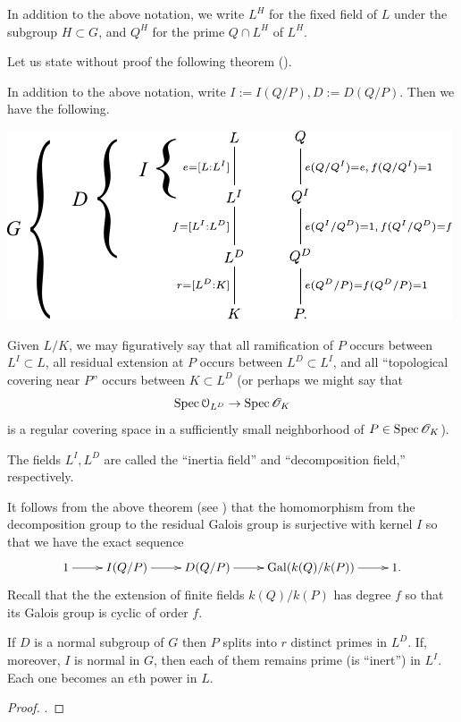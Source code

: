 \documentclass[10pt,a4paper]{amsart}
\begin{document}
\bigskip

In addition to the above notation, we write $L^H$ for the fixed field of $L$
under the subgroup $H\subset G$, and $Q^H$ for the prime $Q\cap L^H$ of $L^H$.

Let us state without proof the following theorem (\cite[Theorem 28,
p.~100]{M}).

\begin{thm} In addition to the above notation, write $I:= I(Q/P), D := D(Q/P)$.
Then we have the following.
\begin{center}
\includegraphics{resources/marcus-inertia-decomp}
\end{center}
\end{thm}

\begin{rem}
Given $L/K$, we may figuratively say that all ramification of $P$ occurs
between $L^I \subset L$, all residual extension at $P$ occurs between $L^D
\subset L^I$, and all ``topological covering near $P$'' occurs between $K
\subset L^D$ (or perhaps we might say that $$\mathrm{Spec}\, \mathcal{O}_{L^D} \rightarrow
\mathrm{Spec}\, \mathscr{O}_K$$ is a regular covering space in a sufficiently small neighborhood
of $P\in \mathrm{Spec}\, \mathscr{O}_K$).
\end{rem}

\begin{rem}
The fields $L^I, L^D$ are called the ``inertia field'' and ``decomposition
field,'' respectively.
\end{rem}

It follows from the above theorem (see \cite[Cor.~1,p.~101]{M}) that the
homomorphism from the decomposition group to the residual Galois group is
surjective with kernel $I$ so that we have the exact sequence \[\xymatrix{
1\ar[r] & I(Q/P) \ar[r] & D(Q/P) \ar[r] & \Gal{k(Q)/k(P)} \ar[r] & 1.}\]
Recall that the the extension of finite fields $k(Q)/k(P)$ has degree $f$ so
that its Galois group is cyclic of order $f$.

\begin{cor}
If $D$ is a normal subgroup of $G$ then $P$ splits into $r$ distinct primes in
$L^D$. If, moreover, $I$ is normal in $G$, then each of them remains prime (is
``inert'') in $L^I$. Each one becomes an $e$th power in $L$.
\end{cor}
\begin{proof} \cite[Cor.~2, p.~102]{M}.
\end{proof}
\end{document}

